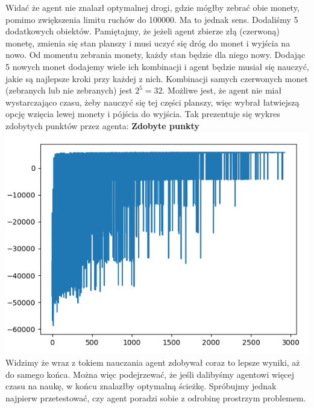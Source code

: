 \documentclass[a4paper,12pt]{article}
\begin{document}
Widać że agent nie znalazł optymalnej drogi, gdzie mógłby zebrać obie monety, pomimo zwiększenia limitu ruchów do 100000. Ma to jednak sens. Dodaliśmy 5 dodatkowych obiektów. Pamiętajmy, że jeżeli agent zbierze złą (czerwoną) monetę, zmienia się stan planszy i musi uczyć się dróg do monet i wyjścia na nowo. Od momentu zebrania monety, każdy stan będzie dla niego nowy. Dodając 5 nowych monet dodajemy wiele ich kombinacji i agent będzie musiał się nauczyć, jakie są najlepsze kroki przy każdej z nich. Kombinacji samych czerwonych monet (zebranych lub nie zebranych) jest \(2^5 = 32\). Możliwe jest, że agent nie miał wystarczająco czasu, żeby nauczyć się tej części planszy, więc wybrał łatwiejszą opcję wzięcia lewej monety i pójścia do wyjścia. Tak prezentuje się wykres zdobytych punktów przez agenta: \newline \newline
\textbf{\Large{Zdobyte punkty}} \newline
\includegraphics[scale=0.9]{testy/wykres2.png}
\newline \newline Widzimy że wraz z tokiem nauczania agent zdobywał coraz to lepsze wyniki, aż do samego końca. Można więc podejrzewać, że jeśli dalibyśmy agentowi więcej czasu na naukę, w końcu znalazłby optymalną ścieżkę. Spróbujmy jednak najpierw przetestować, czy agent poradzi sobie z odrobinę prostrzym problemem.
\end{document}
